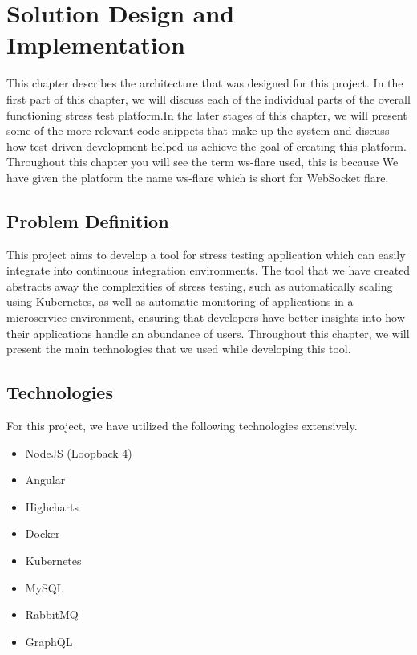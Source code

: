 \chapter{Solution Design and Implementation}

This chapter describes the architecture that was designed for this project. In the first part of this chapter, we will discuss each of the individual parts of the overall functioning stress test platform.In the later stages of this chapter, we will present some of the more relevant code snippets that make up the system and discuss how test-driven development helped us achieve the goal of creating this platform. Throughout this chapter you will see the term ws-flare used, this is because We have given the platform the name ws-flare which is short for WebSocket flare.

\section{Problem Definition}

This project aims to develop a tool for stress testing application which can easily integrate into continuous integration environments. The tool that we have created abstracts away the complexities of stress testing, such as automatically scaling using Kubernetes, as well as automatic monitoring of applications in a microservice environment, ensuring that developers have better insights into how their applications handle an abundance of users. Throughout this chapter, we will present the main technologies that we used while developing this tool.

\section{Technologies}

For this project, we have utilized the following technologies extensively.

\begin{itemize}
  \item NodeJS (Loopback 4)
  \item Angular
  \item Highcharts
  \item Docker
  \item Kubernetes
  \item MySQL
  \item RabbitMQ
  \item GraphQL
\end{itemize}

